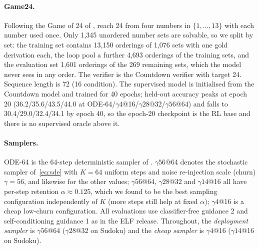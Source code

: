 \paragraph{Game24.}
Following the Game of 24 of \citet{yao2023tot}, reach 24 from four numbers in $\{1,\dots,13\}$ with each number used once. Only 1{,}345 unordered number sets are solvable, so we split by set: the training set contains 13{,}150 orderings of 1{,}076 sets with one gold derivation each, the loop pool a further 4{,}693 orderings of the training sets, and the evaluation set 1{,}601 orderings of the 269 remaining sets, which the model never sees in any order. The verifier is the Countdown verifier with target 24. Sequence length is 72 (16 condition). The supervised model is initialised from the Countdown model and trained for 40 epochs; held-out accuracy peaks at epoch 20 (36.2/35.6/43.5/44.0 at ODE-64/$\gamma4$@16/$\gamma28$@32/$\gamma56$@64) and falls to 30.4/29.0/32.4/34.1 by epoch 40, so the epoch-20 checkpoint is the RL base and there is no supervised oracle above it.

\paragraph{Samplers.}
ODE-64 is the 64-step deterministic sampler of \citet{hu2026elf}. $\gamma56$@64 denotes the stochastic sampler of~\eqref{eq:sde} with $K{=}64$ uniform steps and noise re-injection scale (churn) $\gamma{=}56$, and likewise for the other values; $\gamma56$@64, $\gamma28$@32 and $\gamma14$@16 all have per-step retention $\alpha\approx0.125$, which we found to be the best sampling configuration independently of $K$ (more steps still help at fixed $\alpha$); $\gamma4$@16 is a cheap low-churn configuration. All evaluations use classifier-free guidance 2 and self-conditioning guidance 1 as in the ELF release. Throughout, the \emph{deployment sampler} is $\gamma56$@64 ($\gamma28$@32 on Sudoku) and the \emph{cheap sampler} is $\gamma4$@16 ($\gamma14$@16 on Sudoku).
